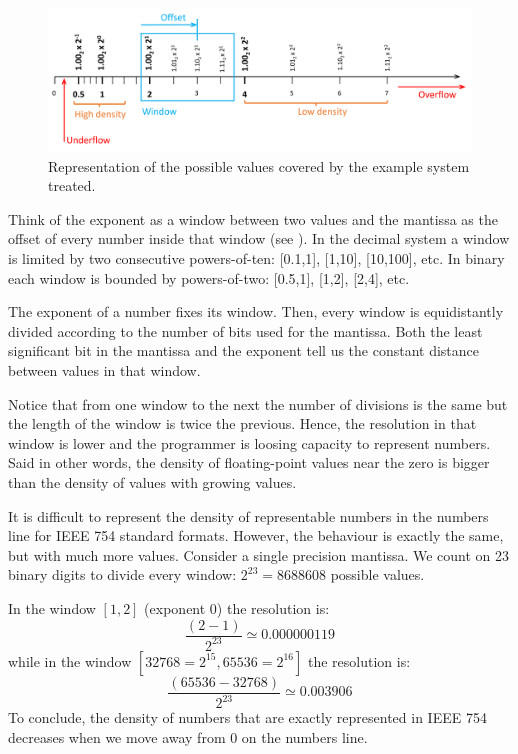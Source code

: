\begin{figure}[h]
    \centering
    \includegraphics[width= \textwidth]{./doc/Figures/DensityNumbers.png}
    \caption{Representation of the possible values covered by the example system treated.}
    \label{fig:DensityNumbers}
\end{figure}




\FloatBarrier
Think of the exponent as a window between two values 
and the mantissa as the offset of every number inside that window (see \cite{VisExpl}).
In the decimal system a window is limited by two consecutive powers-of-ten: [0.1,1], [1,10], [10,100], etc. 
In binary each window is bounded by powers-of-two: [0.5,1], [1,2], [2,4], etc. 

The exponent of a number fixes its window. Then, 
every window is equidistantly divided according to the number of bits used for the mantissa. 
Both the least significant bit in the mantissa and the exponent tell us the constant distance between values in that window. 

Notice that from one window to the next the number of divisions is the same but the length of the window is twice the previous.
Hence, the resolution in that window is lower and the programmer is loosing capacity to represent numbers. 
Said in other words, the density of floating-point values near the zero is bigger than 
the density of values with growing values. 





It is difficult to represent the density of representable numbers in the numbers line for IEEE 754 standard formats.
However, the behaviour is exactly the same, but with much more values.
Consider a single precision mantissa. 
We count on 23 binary digits to divide every window: $2^{23} = 8688608$ possible values. 

In the window $\left[1,2\right]$ (exponent $0$) the resolution is:
$$
\frac{\left(2-1\right)}{2^{23}} \simeq 0.000000119
$$ 
while in the window $\left[32768=2^{15},65536=2^{16}\right]$ the resolution is:
$$
\frac{\left(65536-32768\right)}{2^{23}} \simeq 0.003906
$$
To conclude, the density of numbers that are exactly represented in IEEE 754 decreases 
when we move away from 0 on the numbers line. 





